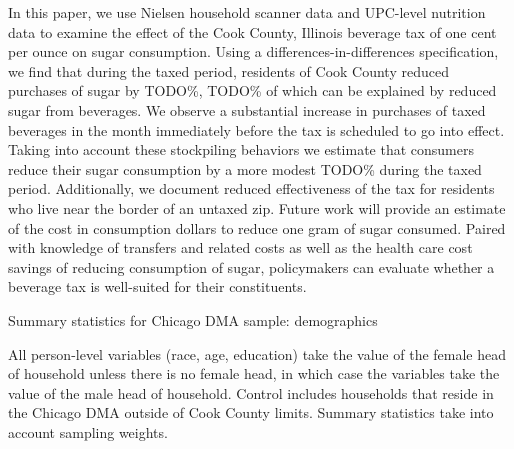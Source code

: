 \documentclass[12pt]{article}
\begin{document}
In this paper, we use Nielsen household scanner data and UPC-level nutrition data to examine the effect of the Cook County, Illinois beverage tax of one cent per ounce on sugar consumption. Using a differences-in-differences specification, we find that during the taxed period, residents of Cook County reduced purchases of sugar by TODO\%, TODO\% of which can be explained by reduced sugar from beverages. We observe a substantial increase in purchases of taxed beverages in the month immediately before the tax is scheduled to go into effect. Taking into account these stockpiling behaviors we estimate that consumers reduce their sugar consumption by a more modest TODO\% during the taxed period. Additionally, we document reduced effectiveness of the tax for residents who live near the border of an untaxed zip. Future work will provide an estimate of the cost in consumption dollars to reduce one gram of sugar consumed. Paired with knowledge of transfers and related costs as well as the health care cost savings of reducing consumption of sugar, policymakers can evaluate whether a beverage tax is well-suited for their constituents.





\clearpage
\printbibliography


\singlespacing
\clearpage
\begin{table}
\caption{Summary statistics for Chicago DMA sample: demographics}
\label{summary_table}

\footnotesize{All person-level variables (race, age, education) take the value of the female head of household unless there is no female head, in which case the variables take the value of the male head of household. Control includes households that reside in the Chicago DMA outside of Cook County limits. Summary statistics take into account sampling weights.}
\end{table}


\clearpage


\clearpage


\clearpage


\clearpage


\clearpage

\end{document}
